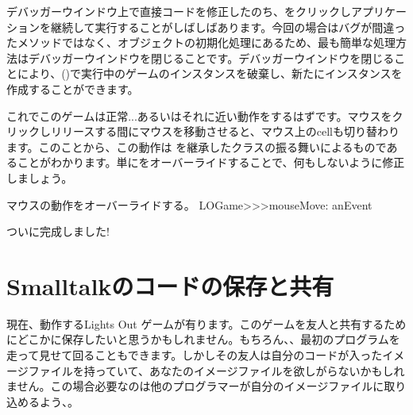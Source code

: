 \documentclass[a4paper,10pt,twoside]{book}
\begin{document}
デバッガーウインドウ上で直接コードを修正したのち、をクリックしアプリケーションを継続して実行することがしばしばあります。今回の場合はバグが間違ったメソッドではなく、オブジェクトの初期化処理にあるため、最も簡単な処理方法はデバッガーウインドウを閉じることです。デバッガーウインドウを閉じることにより、()で実行中のゲームのインスタンスを破棄し、新たにインスタンスを作成することができます。



これでこのゲームは正常...あるいはそれに近い動作をするはずです。マウスをクリックしリリースする間にマウスを移動させると、マウス上のcellも切り替わります。このことから、この動作は  を継承したクラスの振る舞いによるものであることがわかります。単にをオーバーライドすることで、何もしないように修正しましょう。

\begin{method}[mouseMove:]{マウスの動作をオーバーライドする。}
LOGame>>>mouseMove: anEvent
\end{method}

ついに完成しました!


\section{Smalltalkのコードの保存と共有}

現在、動作するLights Out ゲームが有ります。このゲームを友人と共有するためにどこかに保存したいと思うかもしれません。もちろん、、最初のプログラムを走って見せて回ることもできます。しかしその友人は自分のコードが入ったイメージファイルを持っていて、あなたのイメージファイルを欲しがらないかもしれません。この場合必要なのは他のプログラマーが自分のイメージファイルに取り込めるよう、。
\end{document}
